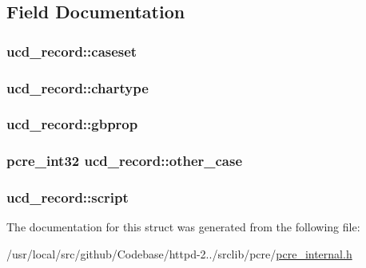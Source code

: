\subsection{Field Documentation}
\subsubsection[{\texorpdfstring{caseset}{caseset}}]{ ucd\+\_\+record\+::caseset}\hypertarget{structucd__record_a020bc2c950fc09e16c6df4e0c5583fce}{}\label{structucd__record_a020bc2c950fc09e16c6df4e0c5583fce}
\subsubsection[{\texorpdfstring{chartype}{chartype}}]{ ucd\+\_\+record\+::chartype}\hypertarget{structucd__record_a176525b7560df127b5569c59b1a78e2d}{}\label{structucd__record_a176525b7560df127b5569c59b1a78e2d}
\subsubsection[{\texorpdfstring{gbprop}{gbprop}}]{ ucd\+\_\+record\+::gbprop}\hypertarget{structucd__record_a59efec089c341aa727512b2a4aa58ff5}{}\label{structucd__record_a59efec089c341aa727512b2a4aa58ff5}
\subsubsection[{\texorpdfstring{other\+\_\+case}{other_case}}]{\setlength{\rightskip}{0pt plus 5cm}pcre\+\_\+int32 ucd\+\_\+record\+::other\+\_\+case}\hypertarget{structucd__record_a66ff6ecee7b043aaad9e5a6f4b7c7898}{}\label{structucd__record_a66ff6ecee7b043aaad9e5a6f4b7c7898}
\subsubsection[{\texorpdfstring{script}{script}}]{ ucd\+\_\+record\+::script}\hypertarget{structucd__record_a4363c8b68c5cc27747c4164a41c90c39}{}\label{structucd__record_a4363c8b68c5cc27747c4164a41c90c39}


The documentation for this struct was generated from the following file\+:\begin{DoxyCompactItemize}
\item 
/usr/local/src/github/\+Codebase/httpd-\/2../srclib/pcre/\hyperlink{pcre__internal_8h}{pcre\+\_\+internal.\+h}\end{DoxyCompactItemize}
